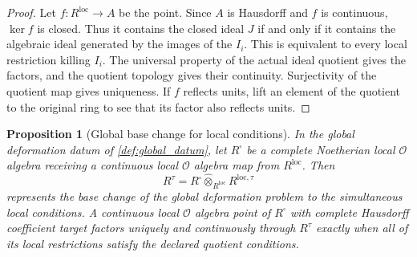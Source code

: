 \documentclass[11pt]{amsart}
\newtheorem{proposition}[proposition]{Proposition}
\theoremstyle{definition}
\theoremstyle{remark}
\newcommand{\OO}{\mathcal O}
\newcommand{\wideotimes}{\mathbin{\widehat\otimes}}
\begin{document}
\begin{proof}
Let \(f:R^{\mathrm{loc}}\to A\) be the point. Since \(A\) is Hausdorff and \(f\) is continuous, \(\ker f\) is closed. Thus it contains the closed ideal \(J\) if and only if it contains the algebraic ideal generated by the images of the \(I_i\). This is equivalent to every local restriction killing \(I_i\). The universal property of the actual ideal quotient gives the factors, and the quotient topology gives their continuity. Surjectivity of the quotient map gives uniqueness. If \(f\) reflects units, lift an element of the quotient to the original ring to see that its factor also reflects units.
\end{proof}

\begin{proposition}[Global base change for local conditions]\label{prop:global_local_basechange}
In the global deformation datum of \cref{def:global_datum}, let \(R^\square\) be a complete Noetherian local \(\OO\) algebra receiving a continuous local \(\OO\) algebra map from \(R^{\mathrm{loc}}\). Then
\[
R^{\tau}
=
R^\square\wideotimes_{R^{\mathrm{loc}}}R^{\mathrm{loc},\tau}
\]
represents the base change of the global deformation problem to the simultaneous local conditions. A continuous local \(\OO\) algebra point of \(R^\square\) with complete Hausdorff coefficient target factors uniquely and continuously through \(R^{\tau}\) exactly when all of its local restrictions satisfy the declared quotient conditions.
\end{proposition}
\end{document}
